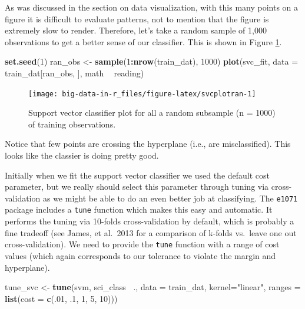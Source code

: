 \documentclass[]{book}
\newenvironment{Shaded}{\begin{snugshade}}{\end{snugshade}}
\newcommand{\DataTypeTok}[1]{\textcolor[rgb]{0.13,0.29,0.53}{#1}}
\newcommand{\DecValTok}[1]{\textcolor[rgb]{0.00,0.00,0.81}{#1}}
\newcommand{\FloatTok}[1]{\textcolor[rgb]{0.00,0.00,0.81}{#1}}
\newcommand{\KeywordTok}[1]{\textcolor[rgb]{0.13,0.29,0.53}{\textbf{#1}}}
\newcommand{\NormalTok}[1]{#1}
\newcommand{\OperatorTok}[1]{\textcolor[rgb]{0.81,0.36,0.00}{\textbf{#1}}}
\newcommand{\StringTok}[1]{\textcolor[rgb]{0.31,0.60,0.02}{#1}}
\begin{document}
As was discussed in the section on data visualization, with this many points on a figure it is difficult to evaluate patterns, not to mention that the figure is extremely slow to render. Therefore, let's take a random sample of 1,000 observations to get a better sense of our classifier. This is shown in Figure \ref{fig:svcplotran}.

\begin{Shaded}
\begin{Highlighting}[]
\KeywordTok{set.seed}\NormalTok{(}\DecValTok{1}\NormalTok{)}
\NormalTok{ran_obs <-}\StringTok{ }\KeywordTok{sample}\NormalTok{(}\DecValTok{1}\OperatorTok{:}\KeywordTok{nrow}\NormalTok{(train_dat), }\DecValTok{1000}\NormalTok{)}
\KeywordTok{plot}\NormalTok{(svc_fit, }\DataTypeTok{data =}\NormalTok{ train_dat[ran_obs, ], math }\OperatorTok{~}\StringTok{ }\NormalTok{reading)}
\end{Highlighting}
\end{Shaded}

\begin{figure}
\texttt{[image: big-data-in-r\_files/figure-latex/svcplotran-1]} \caption{Support vector classifier plot for all a random subsample (n = 1000) of training observations.}\label{fig:svcplotran}
\end{figure}

Notice that few points are crossing the hyperplane (i.e., are misclassified). This looks like the classier is doing pretty good.

Initially when we fit the support vector classifier we used the default cost parameter, but we really should select this parameter through tuning via cross-validation as we might be able to do an even better job at classifying. The \texttt{e1071} package includes a \texttt{tune} function which makes this easy and automatic. It performs the tuning via 10-folds cross-validation by default, which is probably a fine tradeoff (see James, et al.~2013 for a comparison of k-folds vs.~leave one out cross-validation). We need to provide the \texttt{tune} function with a range of cost values (which again corresponds to our tolerance to violate the margin and hyperplane).

\begin{Shaded}
\begin{Highlighting}[]
\NormalTok{tune_svc <-}\StringTok{ }\KeywordTok{tune}\NormalTok{(svm, sci_class }\OperatorTok{~}\NormalTok{., }\DataTypeTok{data =}\NormalTok{ train_dat,}
                 \DataTypeTok{kernel=}\StringTok{"linear"}\NormalTok{,}
                 \DataTypeTok{ranges =} \KeywordTok{list}\NormalTok{(}\DataTypeTok{cost =} \KeywordTok{c}\NormalTok{(.}\DecValTok{01}\NormalTok{, }\FloatTok{.1}\NormalTok{, }\DecValTok{1}\NormalTok{, }\DecValTok{5}\NormalTok{, }\DecValTok{10}\NormalTok{)))}
\end{Highlighting}
\end{Shaded}
\end{document}
